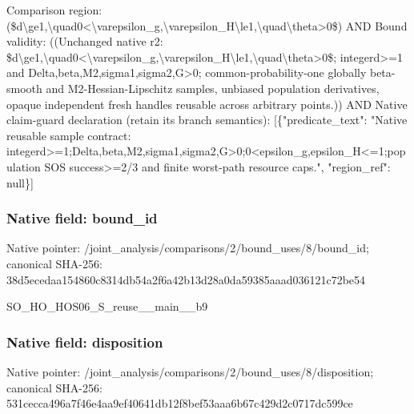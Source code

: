 \documentclass[10pt,a4paper]{article}
\begin{document}
\begingroup\raggedright\sloppy Comparison region:\allowbreak{} (\$d\textbackslash{}ge1,\allowbreak{}\textbackslash{}quad0<\textbackslash{}varepsilon\_\allowbreak{}g,\allowbreak{}\textbackslash{}varepsilon\_\allowbreak{}H\textbackslash{}le1,\allowbreak{}\textbackslash{}quad\textbackslash{}theta>0\$) AND Bound validity:\allowbreak{} ((Unchanged native r2:\allowbreak{} \$d\textbackslash{}ge1,\allowbreak{}\textbackslash{}quad0<\textbackslash{}varepsilon\_\allowbreak{}g,\allowbreak{}\textbackslash{}varepsilon\_\allowbreak{}H\textbackslash{}le1,\allowbreak{}\textbackslash{}quad\textbackslash{}theta>0\$;\allowbreak{} integerd>=\allowbreak{}1 and Delta,\allowbreak{}beta,\allowbreak{}M2,\allowbreak{}sigma1,\allowbreak{}sigma2,\allowbreak{}G>0;\allowbreak{} common-probability-one globally beta-smooth and M2-Hessian-Lipschitz samples,\allowbreak{} unbiased population derivatives,\allowbreak{} opaque independent fresh handles reusable across arbitrary points.)) AND Native claim-guard declaration (retain its branch semantics):\allowbreak{} [\{"predicate\_\allowbreak{}text":\allowbreak{} "Native reusable sample contract:\allowbreak{} integerd>=\allowbreak{}1;\allowbreak{}Delta,\allowbreak{}beta,\allowbreak{}M2,\allowbreak{}sigma1,\allowbreak{}sigma2,\allowbreak{}G>0;\allowbreak{}0<epsilon\_\allowbreak{}g,\allowbreak{}epsilon\_\allowbreak{}H<=\allowbreak{}1;\allowbreak{}population SOS success>=\allowbreak{}2/\allowbreak{}3 and finite worst-path resource caps.",\allowbreak{} "region\_\allowbreak{}ref":\allowbreak{} null\}]\par\endgroup

\subsubsection{Native field: bound\_\allowbreak{}id}
Native pointer: /joint\_\allowbreak{}analysis/comparisons/2/bound\_\allowbreak{}uses/8/bound\_\allowbreak{}id; canonical SHA-256: 38d5ecedaa154860c8314db54a2f6a42b13d28a0da59385aaad036121c72be54

\begingroup\raggedright\sloppy SO\_\allowbreak{}HO\_\allowbreak{}HOS06\_\allowbreak{}S\_\allowbreak{}reuse\_\allowbreak{}\_\allowbreak{}main\_\allowbreak{}\_\allowbreak{}b9\par\endgroup

\subsubsection{Native field: disposition}
Native pointer: /joint\_\allowbreak{}analysis/comparisons/2/bound\_\allowbreak{}uses/8/disposition; canonical SHA-256: 531cecca496a7f46e4aa9ef40641db12f8bef53aaa6b67c429d2c0717dc599ce
\end{document}
